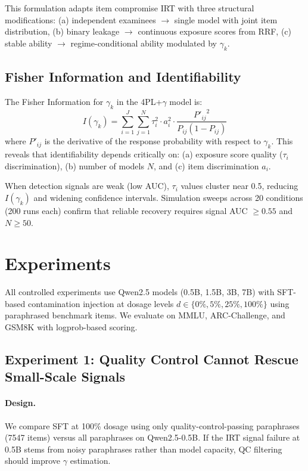 \documentclass[11pt,a4paper]{article}
\begin{document}
This formulation adapts item compromise IRT \citep{eckerly2017detecting,sinharay2017detection} with three structural modifications: (a) independent examinees $\rightarrow$ single model with joint item distribution, (b) binary leakage $\rightarrow$ continuous exposure scores from RRF, (c) stable ability $\rightarrow$ regime-conditional ability modulated by $\gamma_k$.

\subsection{Fisher Information and Identifiability}

The Fisher Information for $\gamma_k$ in the 4PL+$\gamma$ model is:
\begin{equation}
    I(\gamma_k) = \sum_{i=1}^{J} \sum_{j=1}^{N} \tau_i^2 \cdot a_i^2 \cdot \frac{{P'_{ij}}^{2}}{P_{ij}(1-P_{ij})}
\end{equation}
where $P'_{ij}$ is the derivative of the response probability with respect to $\gamma_k$. This reveals that identifiability depends critically on: (a) exposure score quality ($\tau_i$ discrimination), (b) number of models $N$, and (c) item discrimination $a_i$.

When detection signals are weak (low AUC), $\tau_i$ values cluster near 0.5, reducing $I(\gamma_k)$ and widening confidence intervals. Simulation sweeps across 20 conditions (200 runs each) confirm that reliable recovery requires signal AUC $\geq 0.55$ and $N \geq 50$.

\section{Experiments}

All controlled experiments use Qwen2.5 models (0.5B, 1.5B, 3B, 7B) with SFT-based contamination injection at dosage levels $d \in \{0\%, 5\%, 25\%, 100\%\}$ using paraphrased benchmark items. We evaluate on MMLU, ARC-Challenge, and GSM8K with logprob-based scoring.

\subsection{Experiment 1: Quality Control Cannot Rescue Small-Scale Signals}
\label{sec:exp-qc}

\paragraph{Design.} We compare SFT at 100\% dosage using only quality-control-passing paraphrases (7547 items) versus all paraphrases on Qwen2.5-0.5B. If the IRT signal failure at 0.5B stems from noisy paraphrases rather than model capacity, QC filtering should improve $\gamma$ estimation.
\end{document}

